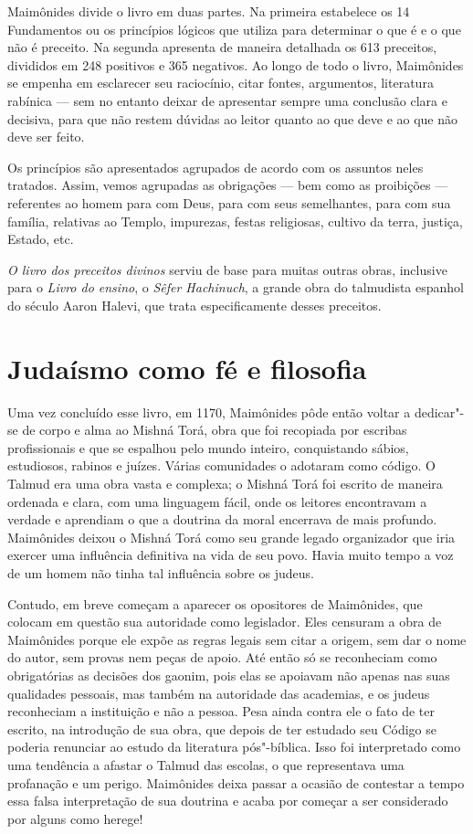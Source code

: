 Maimônides divide o livro em duas partes. Na primeira estabelece os
14 Fundamentos ou os princípios lógicos que utiliza para determinar o
que é e o que não é preceito. Na segunda apresenta de maneira
detalhada os 613 preceitos, divididos em 248 positivos e 365 negativos.
Ao longo de todo o livro, Maimônides se empenha em esclarecer seu
raciocínio, citar fontes, argumentos, literatura rabínica --- sem no
entanto deixar de apresentar sempre uma conclusão clara e decisiva,
para que não restem dúvidas ao leitor quanto ao que deve e ao que não
deve ser feito.

Os princípios são apresentados agrupados de acordo com os assuntos neles tratados. 
Assim, vemos agrupadas as obrigações ---
bem como as proibições --- referentes ao homem para com Deus, para com
seus semelhantes, para com sua família, relativas ao Templo, 
impurezas, festas religiosas, cultivo da terra, justiça, Estado, etc.

\emph{O livro dos preceitos divinos} serviu de base para muitas outras
obras, inclusive para o \emph{Livro do ensino}, o \emph{Sêfer Hachinuch}, a
grande obra do talmudista espanhol do século  Aaron Halevi, que
trata especificamente desses preceitos.

\section{Judaísmo como fé e filosofia}

Uma vez concluído esse livro, em 1170, Maimônides pôde então voltar a
dedicar"-se de corpo e alma ao Mishná Torá, obra que foi
recopiada por escribas profissionais e que se espalhou pelo mundo
inteiro, conquistando sábios, estudiosos, rabinos e juízes. Várias
comunidades o adotaram como código. O Talmud era uma obra vasta
e complexa; o Mishná Torá foi escrito de maneira ordenada e
clara, com uma linguagem fácil, onde os leitores encontravam a verdade
e aprendiam o que a doutrina da moral encerrava de mais profundo.
Maimônides deixou o Mishná Torá como seu grande legado
organizador que iria exercer uma influência definitiva na vida de seu
povo. Havia muito tempo a voz de um homem não tinha tal influência sobre
os judeus.

Contudo, em breve começam a aparecer os opositores de Maimônides, que
colocam em questão sua autoridade como legislador. Eles censuram a obra
de Maimônides porque ele expõe as regras legais sem citar a origem, sem
dar o nome do autor, sem provas nem peças de apoio. Até então só se
reconheciam como obrigatórias as decisões dos gaonim, pois elas se
apoiavam não apenas nas suas qualidades pessoais, mas também na
autoridade das academias, e os judeus reconheciam a instituição e não a
pessoa. Pesa ainda contra ele o fato de ter escrito, na introdução de
sua obra, que depois de ter estudado seu Código se poderia renunciar ao
estudo da literatura pós"-bíblica. Isso foi interpretado como uma
tendência a afastar o Talmud das escolas, o que representava uma
profanação e um perigo. Maimônides deixa passar a ocasião de contestar a
tempo essa falsa interpretação de sua doutrina e acaba por começar a
ser considerado por alguns como herege!

